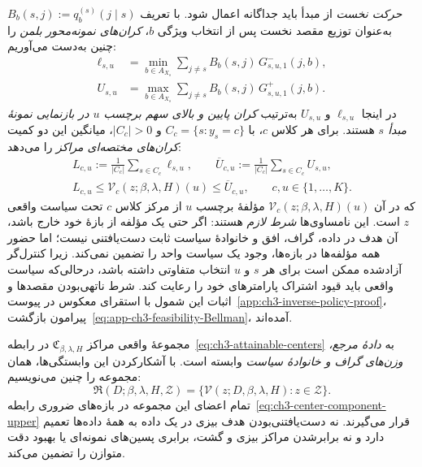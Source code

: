 \emph{حرکت نخست} از مبدأ باید جداگانه اعمال شود. با تعریف
$B_b(s,j):=q_b^{(s)}(j\mid s)$
به‌عنوان توزیع مقصد نخست پس از انتخاب ویژگی $b$، \emph{کران‌های نمونه‌محور بلمن} را چنین به‌دست می‌آوریم:
\begin{equation}\label{eq:ch3-bellman-origin-bounds}
\boxed{\begin{aligned}
\ell_{s,u}
&=\min_{b\in A_{X_s}}\sum_{j\ne s}
B_b(s,j)\,G^-_{s,u,1}(j,b),\\
U_{s,u}
&=\max_{b\in A_{X_s}}\sum_{j\ne s}
B_b(s,j)\,G^+_{s,u,1}(j,b).
\end{aligned}}
\end{equation}
در اینجا $\ell_{s,u}$ و $U_{s,u}$ به‌ترتیب \emph{کران پایین و بالای سهم برچسب $u$ در بازنمایی نمونهٔ مبدأ $s$} هستند. برای هر کلاس $c$، با $C_c=\{s:y_s=c\}$ و $|C_c|>0$، میانگین این دو کمیت \emph{کران‌های مختصه‌ای مراکز} را می‌دهد:
\begin{equation}\label{eq:ch3-center-component-upper}
\boxed{\begin{gathered}
L_{c,u}:=\frac{1}{|C_c|}\sum_{s\in C_c}\ell_{s,u},
\qquad
\overline U_{c,u}:=\frac{1}{|C_c|}\sum_{s\in C_c}U_{s,u},\\
L_{c,u}\le\mathcal V_c(z;\beta,\lambda,H)(u)
\le\overline U_{c,u},
\qquad c,u\in\{1,\ldots,K\}.
\end{gathered}}
\end{equation}
که در آن $\mathcal V_c(z;\beta,\lambda,H)(u)$ مؤلفهٔ برچسب $u$ از مرکز کلاس $c$ تحت سیاست واقعی $z$ است. این نامساوی‌ها \emph{شرط لازم} هستند: اگر حتی یک مؤلفه از بازهٔ خود خارج باشد، آن هدف در داده، گراف، افق و خانوادهٔ سیاست ثابت دست‌یافتنی نیست؛ اما حضور همه مؤلفه‌ها در بازه‌ها، وجود یک سیاست واحد را تضمین نمی‌کند. زیرا کنترل‌گر آزادشده ممکن است برای هر $s$ و $u$ انتخاب متفاوتی داشته باشد، درحالی‌که سیاست واقعی باید قیود اشتراک پارامترهای خود را رعایت کند. شرط ناتهی‌بودن مقصدها و اثبات این شمول با استقرای معکوس در پیوست~\ref{app:ch3-inverse-policy-proof}، پیرامون بازگشت~\eqref{eq:app-ch3-feasibility-Bellman}، آمده‌اند.

مجموعهٔ واقعی مراکز $\mathfrak C_{\beta,\lambda,H}$ در رابطه~\eqref{eq:ch3-attainable-centers} به \emph{دادهٔ مرجع، وزن‌های گراف و خانوادهٔ سیاست} وابسته است. با آشکارکردن این وابستگی‌ها، همان مجموعه را چنین می‌نویسیم:
\begin{equation}\label{eq:ch3-attainable-centers-data-explicit}
\mathfrak R(D;\beta,\lambda,H,\mathcal Z)
=\{\mathcal V(z;D,\beta,\lambda,H):z\in\mathcal Z\}.
\end{equation}
تمام اعضای این مجموعه در بازه‌های ضروری رابطه~\eqref{eq:ch3-center-component-upper} قرار می‌گیرند. نه دست‌یافتنی‌بودن هدف بیزی در یک داده به همهٔ داده‌ها تعمیم دارد و نه برابرشدن مراکز بیزی و گشت، برابری پسین‌های نمونه‌ای یا بهبود دقت متوازن را تضمین می‌کند.


